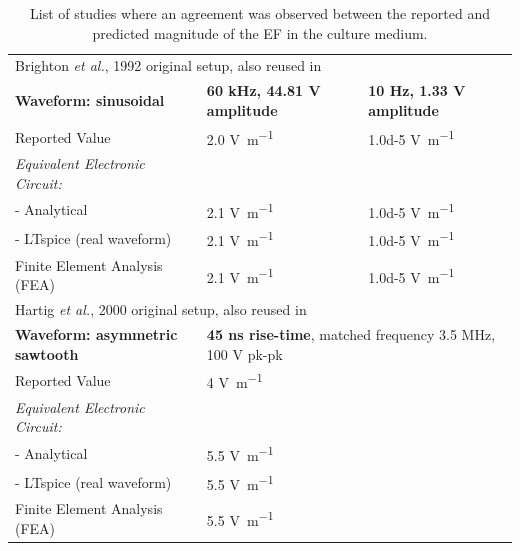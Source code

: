 \begin{table}
\caption{List of studies where an agreement was observed between the reported and predicted magnitude of the \acs{EF} in the culture medium.}
\bigskip
\footnotesize
\centering
\begin{tabularx}{405px}{l l l} \toprule[0.15em]
\multicolumn{3}{l}{Brighton \textit{et al.}, 1992 \cite{Brighton1992-gg} original setup, also reused in \cite{Armstrong1988-ob, Wang2006-hx, Brighton2008-rl, Clark2014-sz}}\\ \cmidrule(l){1-3}
\textbf{Waveform: sinusoidal} & \textbf{60 \si{\kilo\hertz}, \textbf{44.81 \si{\volt} amplitude}} & \textbf{10 \si{\hertz}, \textbf{1.33 \si{\volt} amplitude}} \\
Reported Value & 2.0 \si{\volt\per\meter} & \num{1.0d-5} \si{\volt\per\meter} \\
\textit{Equivalent Electronic Circuit:} & & \\
- Analytical & 2.1 \si{\volt\per\meter} & \num{1.0d-5} \si{\volt\per\meter} \\
- LTspice (real waveform) & 2.1 \si{\volt\per\meter} & \num{1.0d-5} \si{\volt\per\meter} \\
Finite Element Analysis (FEA) & 2.1 \si{\volt\per\meter} & \num{1.0d-5} \si{\volt\per\meter} \\ \cmidrule(l){1-3}


\multicolumn{3}{l}{Hartig \textit{et al.}, 2000 \cite{Hartig2000-ny} original setup, also reused in \cite{Wiesmann2001-uh}}\\ \cmidrule(l){1-3}
\textbf{Waveform: asymmetric sawtooth} &\multicolumn{2}{l}{\textbf{45 \si{\nano\second} rise-time}, matched frequency 3.5 \si{\mega\hertz}, 100 \si{\volt} pk-pk} \\
Reported Value &\multicolumn{2}{l}{4 \si{\volt\per\meter}} \\
\textit{Equivalent Electronic Circuit:} &\multicolumn{2}{l}{} \\
- Analytical &\multicolumn{2}{l}{5.5 \si{\volt\per\meter}}	\\
- LTspice (real waveform) &\multicolumn{2}{l}{5.5 \si{\volt\per\meter}} \\
Finite Element Analysis (FEA) &\multicolumn{2}{l}{5.5 \si{\volt\per\meter}} \\ \cmidrule(l){1-3}



\end{tabularx}
\end{table}
